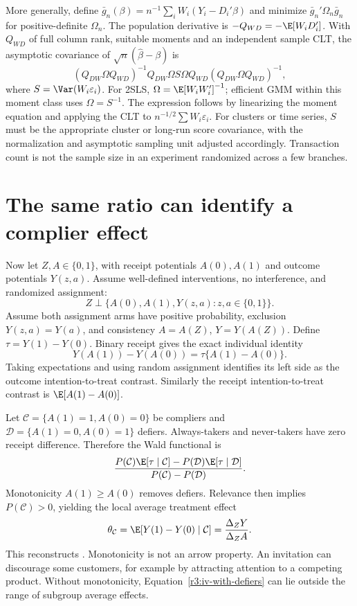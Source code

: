 More generally, define $\bar g_n(\beta)=n^{-1}\sum_iW_i(Y_i-D_i'\beta)$
and minimize $\bar g_n'\Omega_n\bar g_n$ for positive-definite
$\Omega_n$. The population derivative is $-Q_{WD}=-\E[W_iD_i']$.
With $Q_{WD}$ of full column rank, suitable moments and an independent
sample CLT, the asymptotic covariance of $\sqrt n(\widehat\beta-\beta)$ is
\begin{equation}
 (Q_{DW}\Omega Q_{WD})^{-1}Q_{DW}\Omega S\Omega Q_{WD}
 (Q_{DW}\Omega Q_{WD})^{-1},
 \label{r3:gmm-variance}
\end{equation}
where $S=\Var(W_i\varepsilon_i)$. For 2SLS,
$\Omega=\E[W_iW_i']^{-1}$; efficient GMM within this moment class uses
$\Omega=S^{-1}$. The expression follows by linearizing the moment
equation and applying the CLT to $n^{-1/2}\sum W_i\varepsilon_i$.
For clusters or time series, $S$ must be the appropriate cluster or
long-run score covariance, with the normalization and asymptotic sampling
unit adjusted accordingly. Transaction count is not the sample size in
an experiment randomized across a few branches.

\section{The same ratio can identify a complier effect}
\label{r3:late}
Now let $Z,A\in\{0,1\}$, with receipt potentials $A(0),A(1)$ and
outcome potentials $Y(z,a)$. Assume well-defined interventions, no
interference, and randomized assignment:
\[
 Z\perp\{A(0),A(1),Y(z,a):z,a\in\{0,1\}\}.
\]
Assume both assignment arms have positive probability, exclusion
$Y(z,a)=Y(a)$, and consistency
$A=A(Z)$, $Y=Y(A(Z))$. Define $\tau=Y(1)-Y(0)$.
Binary receipt gives the exact individual identity
\begin{equation}
 Y(A(1))-Y(A(0))=\tau\{A(1)-A(0)\}.
 \label{r3:compliance-identity}
\end{equation}
Taking expectations and using random assignment identifies its left side
as the outcome intention-to-treat contrast. Similarly the receipt
intention-to-treat contrast is $\E[A(1)-A(0)]$.

Let $\mathcal C=\{A(1)=1,A(0)=0\}$ be compliers and
$\mathcal D=\{A(1)=0,A(0)=1\}$ defiers. Always-takers and never-takers
have zero receipt difference. Therefore the Wald functional is
\begin{equation}
 \frac{P(\mathcal C)\E[\tau\mid\mathcal C]
             -P(\mathcal D)\E[\tau\mid\mathcal D]}
       {P(\mathcal C)-P(\mathcal D)}.
 \label{r3:iv-with-defiers}
\end{equation}
Monotonicity $A(1)\ge A(0)$ removes defiers. Relevance then implies
$P(\mathcal C)>0$, yielding the local average treatment effect
\begin{equation}
 \theta_{\mathcal C}=\E[Y(1)-Y(0)\mid\mathcal C]
 =\frac{\Delta_Z Y}{\Delta_Z A}.
 \label{r3:late-result}
\end{equation}
This reconstructs \citet[Equation (9), Table 1 and Proposition 1]{angrist1996}.
Monotonicity is not an arrow property. An invitation can discourage some
customers, for example by attracting attention to a competing product.
Without monotonicity, Equation~\eqref{r3:iv-with-defiers} can lie outside
the range of subgroup average effects.


